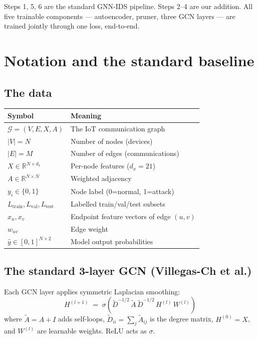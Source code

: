 \documentclass[11pt,a4paper]{article}
\begin{document}
Steps 1, 5, 6 are the standard GNN-IDS pipeline. Steps 2--4 are our
addition. All five trainable components --- autoencoder, pruner, three
GCN layers --- are trained jointly through one loss, end-to-end.

\section{Notation and the standard baseline}
\label{sec:notation}

\subsection{The data}

\begin{tabular}{ll}
\toprule
Symbol & Meaning \\
\midrule
$\mathcal{G} = (V, E, X, A)$ & The IoT communication graph \\
$|V| = N$ & Number of nodes (devices) \\
$|E| = M$ & Number of edges (communications) \\
$X \in \mathbb{R}^{N \times d_x}$ & Per-node features ($d_x = 21$) \\
$A \in \mathbb{R}^{N\times N}$ & Weighted adjacency \\
$y_i \in \{0,1\}$ & Node label (0=normal, 1=attack) \\
$L_{\text{train}}, L_{\text{val}}, L_{\text{test}}$ & Labelled train/val/test subsets \\
$x_u, x_v$ & Endpoint feature vectors of edge $(u,v)$ \\
$w_{uv}$ & Edge weight \\
$\hat{y} \in [0,1]^{N\times 2}$ & Model output probabilities \\
\bottomrule
\end{tabular}

\subsection{The standard 3-layer GCN (Villegas-Ch et al.)}

Each GCN layer applies symmetric Laplacian smoothing:
\begin{equation}
H^{(l+1)} \;=\; \sigma\!\left(\widetilde{D}^{-1/2}\,\widetilde{A}\,\widetilde{D}^{-1/2}\,
H^{(l)}\,W^{(l)}\right)
\label{eq:gcn}
\end{equation}
where $\widetilde{A} = A + I$ adds self-loops, $\widetilde{D}_{ii} =
\sum_j \widetilde{A}_{ij}$ is the degree matrix, $H^{(0)} = X$, and
$W^{(l)}$ are learnable weights. ReLU acts as $\sigma$.
\end{document}
